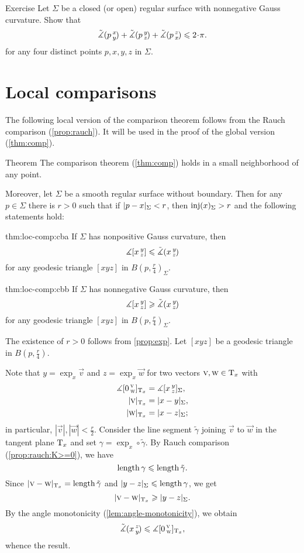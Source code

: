 \begin{thm}{Exercise}\label{ex:sum=<2pi}
Let $\Sigma$ be a closed (or open) regular surface  with nonnegative Gauss curvature.
Show that 
\[\modangle pxy+\modangle pyz+\modangle pzx\le2\cdot \pi.\]
for any four distinct points $p,x,y,z$ in $\Sigma$.
\end{thm}

\section{Local comparisons}\label{sec:loc-comp}

The following local version of the comparison theorem follows from the Rauch comparison (\ref{prop:rauch}).
It will be used in the proof of the global version (\ref{thm:comp}).

\begin{thm}{Theorem}\label{thm:loc-comp}
The comparison theorem (\ref{thm:comp}) holds in a small neighborhood of any point.

Moreover, let $\Sigma$ be a smooth regular surface without boundary. Then for any $p\in \Sigma$ there is $r>0$ such that if $\dist{p}{x}\Sigma<r$, then $\mathop{\rm inj}\nolimits(x)_\Sigma>r$ and the following statements hold:


\begin{subthm}{thm:loc-comp:cba}
If $\Sigma$ has nonpositive Gauss curvature, then 
\[\measuredangle[x\,{}^{y}_{z}]\leqslant\tilde\measuredangle(x\,{}^{y}_{z}\hspace{-0.2ex})\]
for any geodesic triangle $[xyz]$  in $B(p,\tfrac r4)_\Sigma$.
\end{subthm}

\begin{subthm}{thm:loc-comp:cbb}
If $\Sigma$ has nonnegative Gauss curvature, then 
\[\measuredangle[x\,{}^{y}_{z}]\geqslant\tilde\measuredangle(x\,{}^{y}_{z}\hspace{-0.2ex})\]
for any geodesic triangle $[xyz]$ in $B(p,\tfrac r4)_\Sigma$.
\end{subthm}


\end{thm}


The existence of $r>0$ follows from \ref{prop:exp}. Let $[xyz] $ be a geodesic triangle in  $B(p, \tfrac{r}4)$.

Note that $y=\exp_x\vec v$ and $z=\exp_x\vec w$ for two vectors $\text{\sc{v}},\text{\sc{w}}\in\mathrm{T}_x$ with
\begin{align*}
\measuredangle\hinge 0{\vec v}{\vec w}_{\T_x}&=\measuredangle\hinge xyz_\Sigma,
\\
|\vec v|_{\T_x}&=\dist{x}{y}\Sigma, 
\\
|\vec w|_{\T_x}&=\dist{x}{z}\Sigma;
\end{align*}
in particular, $|\vec v|, |\vec w|< \tfrac r2$.
Consider the line segment $\tilde \gamma$ joining $\vec v$ to $\vec w$ in the tangent plane $\mathrm{T}_x$ and set $\gamma=\exp_x\circ\tilde \gamma$.
By Rauch comparison (\ref{prop:rauch:K>=0}), we have
\[\mathop{\rm length}\nolimits\gamma\leqslant \mathop{\rm length}\nolimits \tilde \gamma.\]
Since $\dist{\vec v}{\vec w}{\T_x}=\length\tilde \gamma$ and $\dist{y}{z}\Sigma\le \length\gamma$, we get 
\[\dist{\vec v}{\vec w}{\T_x}\ge \dist{y}{z}\Sigma.\]
By the angle monotonicity (\ref{lem:angle-monotonicity}), we obtain
\[\tilde\measuredangle(x\,{}^{z}_{y}\hspace{-0.2ex})\leqslant\measuredangle[0\,{}^{\text{\sc{v}}}_{\text{\sc{w}}}]_{\mathrm{T}_x},\]
whence the result.

